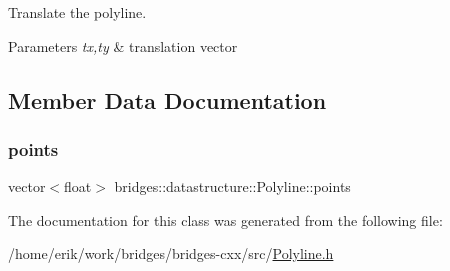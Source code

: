 Translate the polyline. 


\begin{DoxyParams}{Parameters}
{\em tx,ty} & translation vector \\
\hline
\end{DoxyParams}


\subsection{Member Data Documentation}
\mbox{\label{classbridges_1_1datastructure_1_1_polyline_a0df21b6c3cc82930a93a495de5affda7}} 
\subsubsection{\texorpdfstring{points}{points}}
{\footnotesize\ttfamily vector$<$float$>$ bridges\+::datastructure\+::\+Polyline\+::points\hspace{0.3cm}{\ttfamily [protected]}}



The documentation for this class was generated from the following file\+:\begin{DoxyCompactItemize}
\item 
/home/erik/work/bridges/bridges-\/cxx/src/\hyperlink{_polyline_8h}{Polyline.\+h}\end{DoxyCompactItemize}
